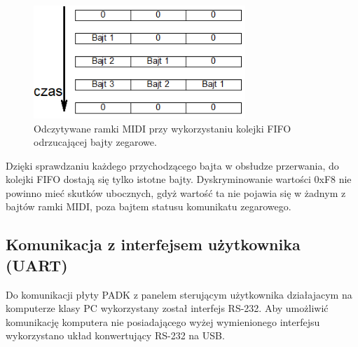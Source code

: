 \begin{figure}[H]
	\centering
	\includegraphics[width=8cm]{./grafiki/real_fifo}
	\captionsetup{justification=centering}
	\caption{Odczytywane ramki MIDI przy wykorzystaniu kolejki FIFO odrzucającej bajty zegarowe.}
	\label{rys:real_fifo}
\end{figure} 
Dzięki sprawdzaniu każdego przychodzącego bajta w obsłudze przerwania, do kolejki FIFO dostają się tylko istotne bajty. Dyskryminowanie wartości 0xF8 nie powinno mieć skutków ubocznych, gdyż wartość ta nie pojawia się w żadnym z bajtów ramki MIDI, poza bajtem statusu komunikatu zegarowego.

\subsection{Komunikacja z interfejsem użytkownika (UART)}\label{sec:real_komunikacja}
Do komunikacji płyty PADK z panelem sterującym użytkownika działajacym na komputerze klasy PC wykorzystany został interfejs RS-232. Aby umożliwić komunikację komputera nie posiadającego wyżej wymienionego interfejsu wykorzystano układ konwertujący RS-232 na USB.

